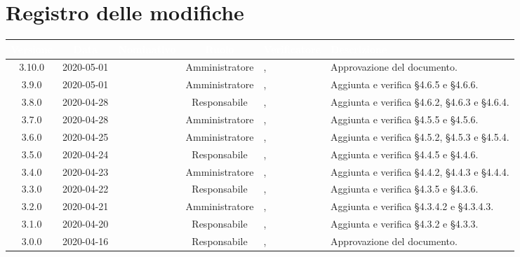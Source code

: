 \section*{Registro delle modifiche}
{
\renewcommand{\arraystretch}{1.5}
\centering
\begin{longtable}{ c c  C{2.3cm} c C{3cm} C{3.2cm}}
\textcolor{white}{\textbf{Versione}}&
\textcolor{white}{\textbf{Data}}&
\textcolor{white}{\textbf{Nominativo}}&
\textcolor{white}{\textbf{Ruolo}}&
\textcolor{white}{\textbf{Verificatore}}&
\textcolor{white}{\textbf{Descrizione}}\\	
\endhead

3.10.0 & 2020-05-01 & \DF{} & Amministratore & \AT{}, \PF{} &  Approvazione del documento. \\

3.9.0 & 2020-05-01 & \BR{} & Amministratore &  \AT{}, \PF{} & Aggiunta e verifica §4.6.5 e §4.6.6.  \\

3.8.0 & 2020-04-28 & \LD{} & Responsabile &  \AT{}, \PF{} & Aggiunta e verifica §4.6.2, §4.6.3 e §4.6.4.  \\

3.7.0 & 2020-04-28 & \SE{} & Amministratore &  \AT{}, \PF{} & Aggiunta e verifica §4.5.5 e §4.5.6.  \\

3.6.0 & 2020-04-25 & \BR{} & Amministratore &  \AT{}, \PF{} & Aggiunta e verifica §4.5.2, §4.5.3 e §4.5.4.  \\

3.5.0 & 2020-04-24 & \LD{} & Responsabile &  \AT{}, \PF{} & Aggiunta e verifica §4.4.5 e §4.4.6.  \\

3.4.0 & 2020-04-23 & \BR{} & Amministratore &  \AT{}, \PF{} & Aggiunta e verifica §4.4.2, §4.4.3 e §4.4.4.  \\

3.3.0 & 2020-04-22 & \LD{} & Responsabile &  \AT{}, \PF{} & Aggiunta e verifica §4.3.5 e §4.3.6.  \\

3.2.0 & 2020-04-21 & \SE{} & Amministratore &  \AT{}, \PF{} & Aggiunta e verifica §4.3.4.2 e §4.3.4.3.  \\

3.1.0 & 2020-04-20 & \LD{} & Responsabile &  \AT{}, \PF{} & Aggiunta e verifica §4.3.2 e §4.3.3.  \\

3.0.0 & 2020-04-16 & \DF{} & Responsabile &  \AT{}, \PF{} & Approvazione del documento.  \\


\end{longtable}}
